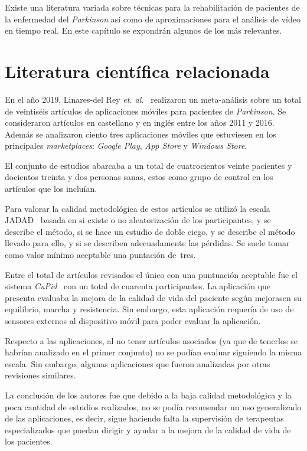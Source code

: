 
Existe una literatura variada sobre técnicas para la rehabilitación de pacientes de la enfermedad del \textit{Parkinson} así como de aproximaciones para el análisis de vídeo en tiempo real. En este capítulo se expondrán algunos de los más relevantes.

\section{Literatura científica relacionada}

En el año 2019, Linares-del Rey \textit{et. al.}~\cite{linares2019aplicaciones} realizaron un meta-análisis sobre un total de veintiséis artículos de aplicaciones móviles para pacientes de \textit{Parkinson}. Se consideraron artículos en castellano y en inglés entre los años 2011 y 2016. Además se analizaron ciento tres aplicaciones móviles que estuviesen en los principales \textit{marketplaces}: \textit{Google Play}, \textit{App Store} y \textit{Windows Store}.

El conjunto de estudios abarcaba a un total de cuatrocientos veinte pacientes y docientos treinta y dos personas sanas, estos como grupo de control en los artículos que los incluían. 

Para valorar la calidad metodológica de estos artículos se utilizó la escala JADAD~\cite{jadad1996assessing} basada en si existe o no aleatorización de los participantes, y se describe el método, si se hace un estudio de doble ciego, y se describe el método llevado para ello, y si se describen adecuadamente las pérdidas. Se suele tomar como valor mínimo aceptable una puntación de~tres.

Entre el total de artículos revisados el único con una puntuación aceptable fue el sistema \textit{CuPid}~\cite{ginis2016feasibility} con un total de cuarenta participantes. La aplicación que presenta evaluaba la mejora de la calidad de vida del paciente según mejorasen su equilibrio, marcha y resistencia. Sin embargo, esta aplicación requería de uso de sensores externos al dispositivo móvil para poder evaluar la aplicación.

Respecto a las aplicaciones, al no tener artículos asociados (ya que de tenerlos se habrían analizado en el primer conjunto) no se podían evaluar siguiendo la misma escala. Sin embargo, algunas aplicaciones que fueron analizadas por otras revisiones similares.

La conclusión de los autores fue que debido a la baja calidad metodológica y la poca cantidad de estudios realizados, no se podía recomendar un uso generalizado de las aplicaciones, es decir, sigue haciendo falta la supervisión de terapeutas especializados que puedan dirigir y ayudar a la mejora de la calidad de vida de los pacientes.

